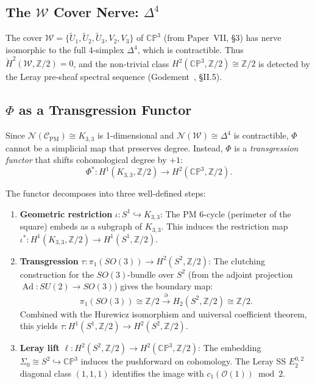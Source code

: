 \documentclass[11pt,a4paper]{article}
\theoremstyle{remark}
\newcommand{\CP}{\mathbb{CP}}
\newcommand{\Z}{\mathbb{Z}}
\newcommand{\cO}{\mathcal{O}}
\newcommand{\cC}{\mathcal{C}}
\newcommand{\cN}{\mathcal{N}}
\newcommand{\cW}{\mathcal{W}}
\begin{document}
\subsection{The $\cW$ Cover Nerve: $\Delta^4$}

The cover $\cW = \{\tilde{U}_1, \tilde{U}_2, \tilde{U}_3, V_2, V_3\}$ of
$\CP^3$ (from Paper~VII, \S3) has nerve isomorphic to the full 4-simplex
$\Delta^4$, which is contractible. Thus $\check{H}^2(\cW, \Z/2) = 0$, and
the non-trivial class $H^2(\CP^3, \Z/2) \cong \Z/2$ is detected by the
Leray pre-sheaf spectral sequence (Godement~\cite{Godement1958}, \S II.5).

\subsection{$\Phi$ as a Transgression Functor}
\label{sec:transgression}

Since $\cN(\cC_{\text{PM}}) \cong K_{3,3}$ is 1-dimensional and
$\cN(\cW) \cong \Delta^4$ is contractible, $\Phi$ cannot be a simplicial
map that preserves degree. Instead, $\Phi$ is a \emph{transgression
functor} that shifts cohomological degree by $+1$:
\[
\Phi^*: H^1(K_{3,3}, \Z/2) \longrightarrow H^2(\CP^3, \Z/2).
\]

The functor decomposes into three well-defined steps:

\begin{enumerate}
  \item \textbf{Geometric restriction} $\iota: S^1 \hookrightarrow K_{3,3}$: The PM
    6-cycle (perimeter of the square) embeds as a subgraph of $K_{3,3}$.
    This induces the restriction map
    $\iota^*: H^1(K_{3,3}, \Z/2) \to H^1(S^1, \Z/2)$.

  \item \textbf{Transgression} $\tau: \pi_1(SO(3)) \to H^2(S^2, \Z/2)$:
    The clutching construction for the $SO(3)$-bundle over $S^2$ (from
    the adjoint projection $\operatorname{Ad}: SU(2) \to SO(3)$) gives
    the boundary map:
    \[
    \pi_1(SO(3)) \cong \Z/2 \xrightarrow{\partial} H_2(S^2, \Z/2) \cong \Z/2.
    \]
    Combined with the Hurewicz isomorphism and universal coefficient
    theorem, this yields $\tau: H^1(S^1, \Z/2) \to H^2(S^2, \Z/2)$.

  \item \textbf{Leray lift} $\ell: H^2(S^2, \Z/2) \to H^2(\CP^3, \Z/2)$:
    The embedding $\Sigma_0 \cong S^2 \hookrightarrow \CP^3$ induces the
    pushforward on cohomology. The Leray SS $E_2^{0,2}$ diagonal class
    $(1,1,1)$ identifies the image with $c_1(\cO(1)) \bmod 2$.
\end{enumerate}
\end{document}
